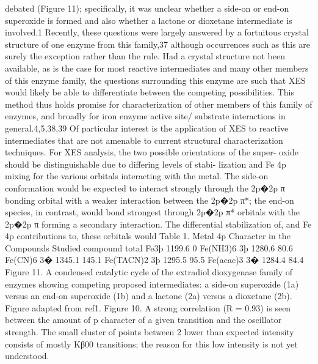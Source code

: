 debated (Figure 11); speciﬁcally, it was unclear whether a side-on
or end-on superoxide is formed and also whether a lactone or
dioxetane intermediate is involved.1 Recently, these questions
were largely answered by a fortuitous crystal structure of one
enzyme from this family,37 although occurrences such as this are
surely the exception rather than the rule. Had a crystal structure
not been available, as is the case for most reactive intermediates
and many other members of this enzyme family, the questions
surrounding this enzyme are such that XES would likely be able
to diﬀerentiate between the competing possibilities. This method
thus holds promise for characterization of other members of this
family of enzymes, and broadly for iron enzyme active site/
substrate interactions in general.4,5,38,39 Of particular interest is
the application of XES to reactive intermediates that are not
amenable to current structural characterization techniques.
For XES analysis, the two possible orientations of the super-
oxide should be distinguishable due to diﬀering levels of stabi-
lization and Fe 4p mixing for the various orbitals interacting with
the metal. The side-on conformation would be expected to
interact strongly through the 2p�2p π bonding orbital with a
weaker interaction between the 2p�2p π*; the end-on species, in
contrast, would bond strongest through 2p�2p π* orbitals with
the 2p�2p π forming a secondary interaction. The diﬀerential
stabilization of, and Fe 4p contributions to, these orbitals would
Table 1. Metal 4p Character in the Compounds Studied
compound
total %
Fe3þ
1199.6%
0%
Fe(NH3)6
3þ
1280.6%
80.6%
Fe(CN)6
3�
1345.1%
145.1%
Fe(TACN)2
3þ
1295.5%
95.5%
Fe(acac)3
3�
1284.4%
84.4%
Figure 11. A condensed catalytic cycle of the extradiol dioxygenase family of enzymes showing competing proposed intermediates: a side-on superoxide
(1a) versus an end-on superoxide (1b) and a lactone (2a) versus a dioxetane (2b). Figure adapted from ref1.
Figure 10. A strong correlation (R = 0.93) is seen between the amount
of p character of a given transition and the oscillator strength. The small
cluster of points between 2%
lower than expected intensity consists of mostly Kβ00 transitions; the
reason for this low intensity is not yet understood.



